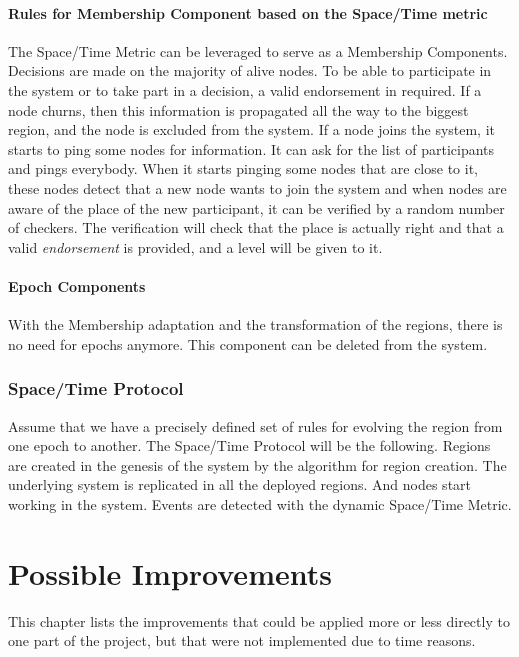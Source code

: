 \documentclass[a4paper,11pt,oneside]{report}
\begin{document}
\subsubsection{Rules for Membership Component based on the Space/Time metric}
The Space/Time Metric can be leveraged to serve as a Membership Components.
Decisions are made on the majority of alive nodes. To be able to participate in
the system or to take part in a decision, a valid endorsement in required. If a
node churns, then this information is propagated all the way to the
biggest region, and the node is excluded from the system.  If a node joins the
system, it starts to ping some nodes for information. It can ask for the list
of participants and pings everybody. When it starts pinging some nodes that are
close to it, these nodes detect that a new node wants to join the system and
when nodes are aware of the place of the new participant, it can be verified by
a random number of checkers. The verification will check that the place is
actually right and that a valid \textit{endorsement} is provided, and a level
will be given to it. 

\subsubsection{Epoch Components}
With the Membership adaptation and the transformation of the regions, there is
no need for epochs anymore. This component can be deleted from the system. 

\subsection{Space/Time Protocol}
Assume that we have a precisely defined set of rules for evolving the region
from one epoch to another.  The Space/Time Protocol will be the following.
Regions are created in the genesis of the system by the algorithm for region
creation. The underlying system is replicated in all the deployed regions. And
nodes start working in the system. Events are detected with the dynamic
Space/Time Metric. 

\chapter{Possible Improvements}

This chapter lists the improvements that could be applied more or less directly
to one part of the project, but that were not implemented due to time reasons. 
\end{document}

